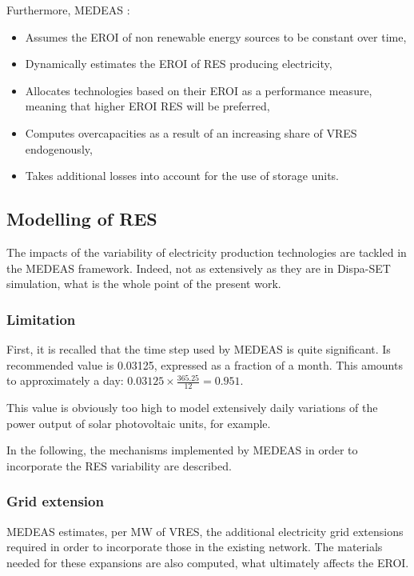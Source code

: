 Furthermore, MEDEAS \cite{medeas-eroi}:
\begin{itemize}
    \item Assumes the EROI of non renewable energy sources to be constant over time,
    \item Dynamically estimates the EROI of RES producing electricity,
    \item Allocates technologies based on their EROI as a performance measure, meaning that higher EROI RES will be preferred,
    \item Computes overcapacities as a result of an increasing share of VRES endogenously,
    \item Takes additional losses into account for the use of storage units.
\end{itemize}

\subsection{Modelling of RES}

The impacts of the variability of electricity production technologies are tackled in the MEDEAS framework. Indeed, not as extensively as they are in Dispa-SET simulation, what is the whole point of the present work.

\subsubsection{Limitation}

First, it is recalled that the time step used by MEDEAS is quite significant. Is recommended value is 0.03125, expressed as a fraction of a month. This amounts to approximately a day: $0.03125 \times \frac{365.25}{12} = 0.951$.

This value is obviously too high to model extensively daily variations of the power output of solar photovoltaic units, for example.

In the following, the mechanisms implemented by MEDEAS in order to incorporate the RES variability are described.

\subsubsection{Grid extension}

MEDEAS estimates, per MW of VRES, the additional electricity grid extensions required in order to incorporate those in the existing network. The materials needed for these expansions are also computed, what ultimately affects the EROI.

